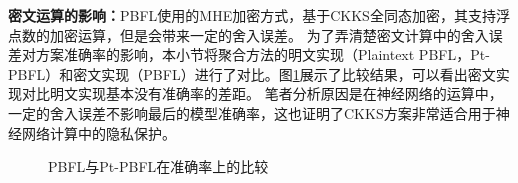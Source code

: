 \textbf{密文运算的影响：}PBFL使用的MHE加密方式，基于CKKS全同态加密，其支持浮点数的加密运算，但是会带来一定的舍入误差。
为了弄清楚密文计算中的舍入误差对方案准确率的影响，本小节将聚合方法的明文实现（Plaintext PBFL，Pt-PBFL）和密文实现（PBFL）进行了对比。图\ref{f4}展示了比较结果，可以看出密文实现对比明文实现基本没有准确率的差距。
笔者分析原因是在神经网络的运算中，一定的舍入误差不影响最后的模型准确率，这也证明了CKKS方案非常适合用于神经网络计算中的隐私保护。

\begin{figure}[htb]
	\centering
	\caption{PBFL与Pt-PBFL在准确率上的比较}
	\label{f4}
\end{figure}

